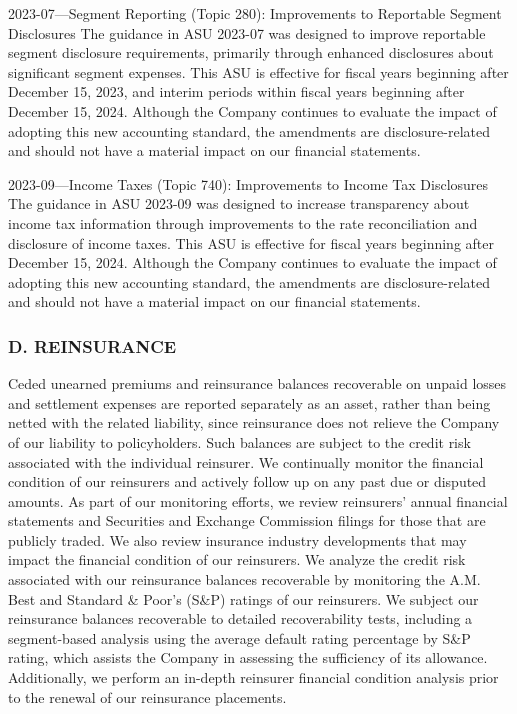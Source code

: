 \documentclass{article}
\begin{document}
2023-07—Segment Reporting (Topic 280): Improvements to Reportable Segment Disclosures
The guidance in ASU 2023-07 was designed to improve reportable segment disclosure requirements, primarily through enhanced disclosures about significant segment expenses. This ASU is effective for fiscal years beginning after December 15, 2023, and interim periods within fiscal years beginning after December 15, 2024. Although the Company continues to evaluate the impact of adopting this new accounting standard, the amendments are disclosure-related and should not have a material impact on our financial statements.

2023-09—Income Taxes (Topic 740): Improvements to Income Tax Disclosures
The guidance in ASU 2023-09 was designed to increase transparency about income tax information through improvements to the rate reconciliation and disclosure of income taxes. This ASU is effective for fiscal years beginning after December 15, 2024. Although the Company continues to evaluate the impact of adopting this new accounting standard, the amendments are disclosure-related and should not have a material impact on our financial statements.

\subsubsection*{D. REINSURANCE}
Ceded unearned premiums and reinsurance balances recoverable on unpaid losses and settlement expenses are reported separately as an asset, rather than being netted with the related liability, since reinsurance does not relieve the Company of our liability to policyholders. Such balances are subject to the credit risk associated with the individual reinsurer. We continually monitor the financial condition of our reinsurers and actively follow up on any past due or disputed amounts. As part of our monitoring efforts, we review reinsurers' annual financial statements and Securities and Exchange Commission filings for those that are publicly traded. We also review insurance industry developments that may impact the financial condition of our reinsurers. We analyze the credit risk associated with our reinsurance balances recoverable by monitoring the A.M. Best and Standard \& Poor's (S\&P) ratings of our reinsurers. We subject our reinsurance balances recoverable to detailed recoverability tests, including a segment-based analysis using the average default rating percentage by S\&P rating, which assists the Company in assessing the sufficiency of its allowance. Additionally, we perform an in-depth reinsurer financial condition analysis prior to the renewal of our reinsurance placements.
\end{document}
